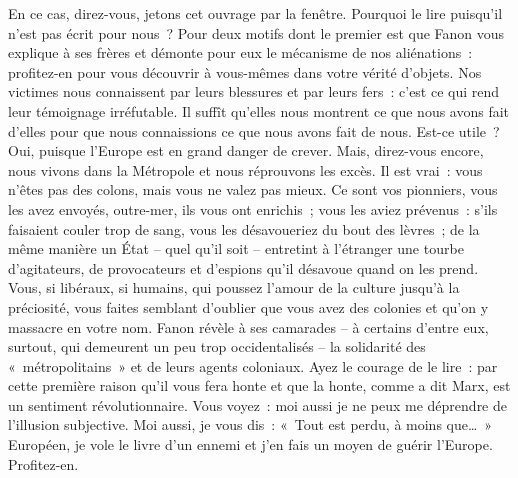 \documentclass[french,twoside]{book} %
\newcommand{\astermono}{\medskip\centerline{\color{rubric}\large\selectfont{\syms ✻}}\medskip\par}%
\begin{document}
En ce cas, direz-vous, jetons cet ouvrage par la fenêtre. Pourquoi le lire puisqu’il n’est pas écrit pour nous ? Pour deux motifs dont le premier est que Fanon vous explique à ses frères et démonte pour eux le mécanisme de nos aliénations : profitez-en pour vous découvrir à vous-mêmes dans votre vérité d’objets. Nos victimes nous connaissent par leurs blessures et par leurs fers : c’est ce qui rend leur témoignage irréfutable. Il suffît qu’elles nous montrent ce que nous avons fait d’elles pour que nous connaissions ce que nous avons fait de nous. Est-ce utile ? Oui, puisque l’Europe est en grand danger de crever. Mais, direz-vous encore, nous vivons dans la Métropole et nous réprouvons les excès. Il est vrai : vous n’êtes pas des colons, mais vous ne valez pas mieux. Ce sont vos pionniers, vous les avez envoyés, outre-mer, ils vous ont enrichis ; vous les aviez prévenus : s’ils faisaient couler trop de sang, vous les désavoueriez du bout des lèvres ; de la même manière un État – quel qu’il soit – entretint à l’étranger une tourbe d’agitateurs, de provocateurs et d’espions qu’il désavoue quand on les prend. Vous, si libéraux, si humains, qui poussez l’amour de la culture jusqu’à la préciosité, vous faites semblant d’oublier que vous avez des colonies et qu’on y massacre en votre nom. Fanon révèle à ses camarades – à certains d’entre eux, surtout, qui demeurent un peu trop occidentalisés – la solidarité des « métropolitains » et   de leurs agents coloniaux. Ayez le courage de le lire : par cette première raison qu’il vous fera honte et que la honte, comme a dit Marx, est un sentiment révolutionnaire. Vous voyez : moi aussi je ne peux me déprendre de l’illusion subjective. Moi aussi, je vous dis : « Tout est perdu, à moins que… » Européen, je vole le livre d’un ennemi et j’en fais un moyen de guérir l’Europe. Profitez-en.\par

\astermono
\end{document}
